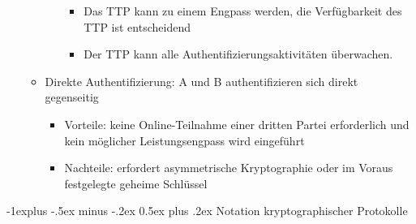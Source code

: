 \documentclass[a4paper]{article}
\makeatletter
\renewcommand{\subsection}{\@startsection{subsection}{2}{0mm}%
 {-1explus -.5ex minus -.2ex}%
 {0.5ex plus .2ex}%
 {\normalfont\normalsize\bfseries}}
\makeatother
\begin{document}
\begin{multicols}{3}
\begin{itemize}
\begin{itemize}
\begin{itemize}
                                  \begin{itemize}
                                      \item
                                            Das TTP kann zu einem Engpass werden, die Verfügbarkeit des TTP
                                            ist entscheidend
                                      \item
                                            Der TTP kann alle Authentifizierungsaktivitäten überwachen.
                                  \end{itemize}
                        \end{itemize}
                  \item
                        Direkte Authentifizierung: A und B authentifizieren sich direkt
                        gegenseitig

                        \begin{itemize}
                            \item
                                  Vorteile: keine Online-Teilnahme einer dritten Partei erforderlich
                                  und kein möglicher Leistungsengpass wird eingeführt
                            \item
                                  Nachteile: erfordert asymmetrische Kryptographie oder im Voraus
                                  festgelegte geheime Schlüssel
                        \end{itemize}
              \end{itemize}
    \end{itemize}


    \subsection{Notation kryptographischer
        Protokolle}


\end{multicols}
\end{document}
